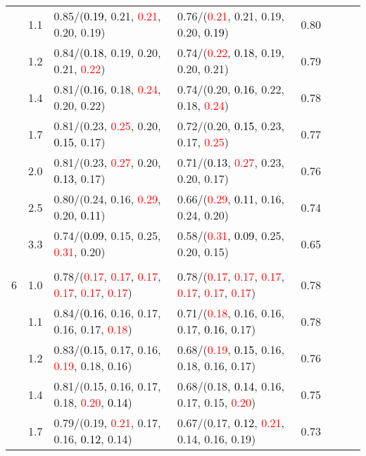 \documentclass[10pt,a4paper]{report}
\begin{document}
\begin{table}[!htbp]
\begin{center}
{\begin{tabular}{ccllcccc}
			&1.1&0.85/(\textcolor{black}{0.19}, 0.21, \textcolor{red}{0.21}, 0.20, 0.19)&0.76/(\textcolor{red}{0.21}, 0.21, 0.19, 0.20, \textcolor{black}{0.19})&0.80\\
			&1.2&0.84/(\textcolor{black}{0.18}, 0.19, 0.20, 0.21, \textcolor{red}{0.22})&0.74/(\textcolor{red}{0.22}, \textcolor{black}{0.18}, 0.19, 0.20, 0.21)&0.79\\
			&1.4&0.81/(\textcolor{black}{0.16}, 0.18, \textcolor{red}{0.24}, 0.20, 0.22)&0.74/(0.20, \textcolor{black}{0.16}, 0.22, 0.18, \textcolor{red}{0.24})&0.78\\
			&1.7&0.81/(0.23, \textcolor{red}{0.25}, 0.20, \textcolor{black}{0.15}, 0.17)&0.72/(0.20, \textcolor{black}{0.15}, 0.23, 0.17, \textcolor{red}{0.25})&0.77\\
			&2.0&0.81/(0.23, \textcolor{red}{0.27}, 0.20, \textcolor{black}{0.13}, 0.17)&0.71/(\textcolor{black}{0.13}, \textcolor{red}{0.27}, 0.23, 0.20, 0.17)&0.76\\
			&2.5&0.80/(0.24, 0.16, \textcolor{red}{0.29}, 0.20, \textcolor{black}{0.11})&0.66/(\textcolor{red}{0.29}, \textcolor{black}{0.11}, 0.16, 0.24, 0.20)&0.74\\
			&3.3&0.74/(\textcolor{black}{0.09}, 0.15, 0.25, \textcolor{red}{0.31}, 0.20)&0.58/(\textcolor{red}{0.31}, \textcolor{black}{0.09}, 0.25, 0.20, 0.15)&0.65\\
			&&&&\\
			6			&1.0&0.78/(\textcolor{red}{0.17}, \textcolor{red}{0.17}, \textcolor{red}{0.17}, \textcolor{red}{0.17}, \textcolor{red}{0.17}, \textcolor{red}{0.17})&0.78/(\textcolor{red}{0.17}, \textcolor{red}{0.17}, \textcolor{red}{0.17}, \textcolor{red}{0.17}, \textcolor{red}{0.17}, \textcolor{red}{0.17})&0.78\\
			&1.1&0.84/(\textcolor{black}{0.16}, 0.16, 0.17, 0.16, 0.17, \textcolor{red}{0.18})&0.71/(\textcolor{red}{0.18}, 0.16, 0.16, 0.17, \textcolor{black}{0.16}, 0.17)&0.78\\
			&1.2&0.83/(\textcolor{black}{0.15}, 0.17, 0.16, \textcolor{red}{0.19}, 0.18, 0.16)&0.68/(\textcolor{red}{0.19}, \textcolor{black}{0.15}, 0.16, 0.18, 0.16, 0.17)&0.76\\
			&1.4&0.81/(0.15, 0.16, 0.17, 0.18, \textcolor{red}{0.20}, \textcolor{black}{0.14})&0.68/(0.18, \textcolor{black}{0.14}, 0.16, 0.17, 0.15, \textcolor{red}{0.20})&0.75\\
			&1.7&0.79/(0.19, \textcolor{red}{0.21}, 0.17, 0.16, \textcolor{black}{0.12}, 0.14)&0.67/(0.17, \textcolor{black}{0.12}, \textcolor{red}{0.21}, 0.14, 0.16, 0.19)&0.73\\

\end{tabular}}
\end{center}
\end{table}
\end{document}
